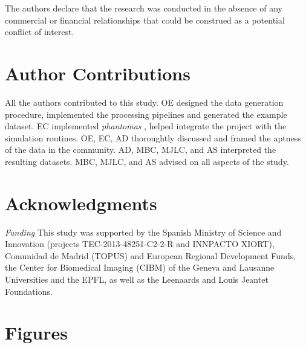 \documentclass[english]{frontiers/frontiersSCNS} %
\begin{document}
The authors declare that the research was conducted in the absence of any commercial or financial relationships that could be construed as a potential conflict of interest.

\section*{Author Contributions}
All the authors contributed to this study.
OE designed the data generation procedure, implemented the processing pipelines and generated the example dataset.
EC implemented \emph{phantomas} \citep{caruyer_phantomas_2014}, helped integrate the project with the simulation routines.
OE, EC, AD thoroughtly discussed and framed the aptness of the data in the community.
AD, MBC, MJLC, and AS interpreted the resulting datasets.
MBC, MJLC, and AS advised on all aspects of the study.


\section*{Acknowledgments}
\textit{Funding\textcolon}
This study was supported by the Spanish Ministry of Science and Innovation
  (projects TEC-2013-48251-C2-2-R and INNPACTO XIORT), Comunidad de Madrid (TOPUS) and
  European Regional Development Funds, the Center for Biomedical Imaging
  (CIBM) of the Geneva and Lausanne Universities and the EPFL, as well as the
  Leenaards and Louis Jeantet Foundations.






\glsresetall

\section*{Figures}
\end{document}
